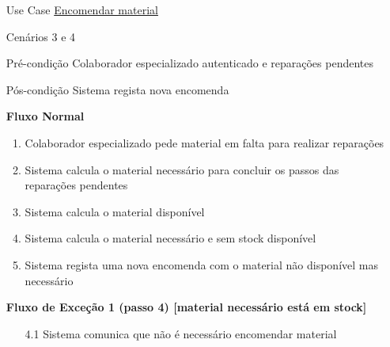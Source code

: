 \documentclass[../relatorio.tex]{subfiles}
\begin{document}
\begin{itemize}
    \item[Use Case] {\underline{Encomendar material}}
    \item[Cenários] {3 e 4}
    \item[Pré-condição] {Colaborador especializado autenticado e reparações pendentes}
    \item[Pós-condição] {Sistema regista nova encomenda}
          \begin{flushleft}
              \textbf{Fluxo Normal}
          \end{flushleft}
          \begin{enumerate}
              \item Colaborador especializado pede material em falta para realizar reparações
              \item Sistema calcula o material necessário para concluir os passos das reparações pendentes
              \item Sistema calcula o material disponível
              \item Sistema calcula o material necessário e sem stock disponível
              \item Sistema regista uma nova encomenda com o material não disponível mas necessário
          \end{enumerate}
          \begin{flushleft}
              \textbf{Fluxo de Exceção 1 (passo 4) [material necessário está em stock]}
          \end{flushleft}
          \begin{itemize}
              \item[4.1] {Sistema comunica que não é necessário encomendar material}
          \end{itemize}
\end{itemize}
\end{document}
